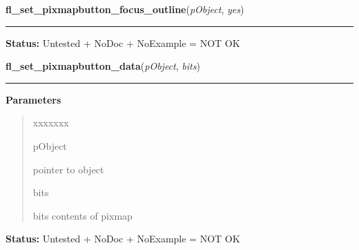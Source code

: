     \label{xformslib:library:fl_set_pixmapbutton_focus_outline}

    \vspace{0.5ex}

\hspace{.8\funcindent}\begin{boxedminipage}{\funcwidth}

    \raggedright \textbf{fl\_set\_pixmapbutton\_focus\_outline}(\textit{pObject}, \textit{yes})

    \vspace{-1.5ex}

    \rule{\textwidth}{0.5\fboxrule}
\setlength{\parskip}{2ex}
\setlength{\parskip}{1ex}
\textbf{Status:} Untested + NoDoc + NoExample = NOT OK



    \end{boxedminipage}

    \label{xformslib:library:fl_set_pixmap_data}

    \vspace{0.5ex}

\hspace{.8\funcindent}\begin{boxedminipage}{\funcwidth}

    \raggedright \textbf{fl\_set\_pixmapbutton\_data}(\textit{pObject}, \textit{bits})

    \vspace{-1.5ex}

    \rule{\textwidth}{0.5\fboxrule}
\setlength{\parskip}{2ex}
\setlength{\parskip}{1ex}
      \textbf{Parameters}
      \vspace{-1ex}

      \begin{quote}
        \begin{Ventry}{xxxxxxx}

          \item[pObject]

          pointer to object

          \item[bits]

          bits contents of pixmap

        \end{Ventry}

      \end{quote}

\textbf{Status:} Untested + NoDoc + NoExample = NOT OK



    \end{boxedminipage}

